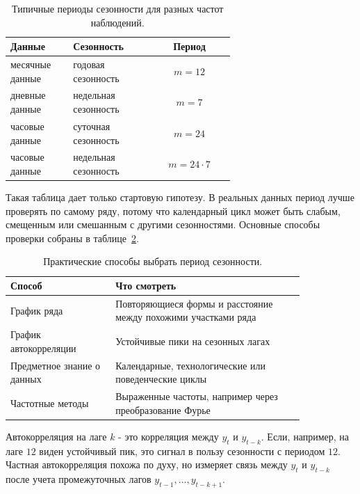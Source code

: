 \documentclass[12pt,fleqn]{article}
\begin{document}
\begin{table}[!htbp]
  \centering
  \small
  \renewcommand{\arraystretch}{1.15}
  \begin{tabular}{|>{\raggedright\arraybackslash}p{0.28\linewidth}|>{\raggedright\arraybackslash}p{0.36\linewidth}|c|}
    \hline
    Данные & Сезонность & Период \\ \hline
    месячные данные & годовая сезонность & \(m=12\) \\ \hline
    дневные данные & недельная сезонность & \(m=7\) \\ \hline
    часовые данные & суточная сезонность & \(m=24\) \\ \hline
    часовые данные & недельная сезонность & \(m=24\cdot 7\) \\ \hline
  \end{tabular}
  \caption{Типичные периоды сезонности для разных частот наблюдений.}
  \label{tab:decompose_period_examples}
\end{table}

Такая таблица дает только стартовую гипотезу.
В реальных данных период лучше проверять по самому ряду, потому что календарный цикл может быть слабым, смещенным или смешанным с другими сезонностями.
Основные способы проверки собраны в таблице~\ref{tab:decompose_period_diagnostics}.

\begin{table}[!htbp]
  \centering
  \small
  \renewcommand{\arraystretch}{1.15}
  \begin{tabular}{|>{\raggedright\arraybackslash}p{0.30\linewidth}|>{\raggedright\arraybackslash}p{0.54\linewidth}|}
    \hline
    Способ & Что смотреть \\ \hline
    График ряда & Повторяющиеся формы и расстояние между похожими участками ряда \\ \hline
    График автокорреляции & Устойчивые пики на сезонных лагах \\ \hline
    Предметное знание о данных & Календарные, технологические или поведенческие циклы \\ \hline
    Частотные методы & Выраженные частоты, например через преобразование Фурье \\ \hline
  \end{tabular}
  \caption{Практические способы выбрать период сезонности.}
  \label{tab:decompose_period_diagnostics}
\end{table}

Автокорреляция на лаге \(k\) - это корреляция между \(y_t\) и \(y_{t-k}\).
Если, например, на лаге \(12\) виден устойчивый пик, это сигнал в пользу сезонности с периодом \(12\).
Частная автокорреляция похожа по духу, но измеряет связь между \(y_t\) и \(y_{t-k}\) после учета промежуточных лагов \(y_{t-1},\ldots,y_{t-k+1}\).
\end{document}
